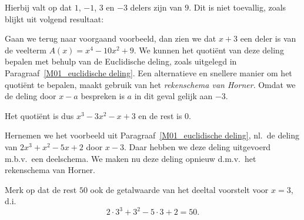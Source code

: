 \documentclass{ximera}
\begin{document}
Hierbij valt op dat $1$, $-1$, $3$ en $-3$ delers zijn van $9$.
Dit is niet toevallig, zoals blijkt uit volgend resultaat:

\noindent{}

Gaan we terug naar voorgaand voorbeeld, dan zien we dat $x+3$ een
deler is van de veelterm $A(x)=x^4-10x^2+9$. We kunnen het
quoti\"{e}nt van deze deling bepalen met behulp van de Euclidische
deling, zoals uitgelegd in Paragraaf~\ref{M01_euclidische deling}. Een
alternatieve en snellere manier om het quoti\"{e}nt te bepalen,
maakt gebruik van het \emph{rekenschema van Horner}. Omdat we de
deling door $x-a$ bespreken is $a$ in dit geval gelijk aan $-3$.

\begin{center}%
\end{center}

\noindent Het quoti\"{e}nt is dus $x^3-3x^2-x+3$ en de rest is
$0$.

Hernemen we het voorbeeld uit Paragraaf~\ref{M01_euclidische deling},
nl.~de deling van $2x^3+x^2-5x+2$ door $x-3$. Daar hebben we deze
deling uitgevoerd m.b.v.~een deelschema. We maken nu deze deling
opnieuw d.m.v.~het rekenschema van Horner.

\begin{center}%
\end{center}

\noindent Merk op dat de rest $50$ ook de getalwaarde van het
deeltal voorstelt voor $x=3$, d.i.\[2\cdot3^3+3^2-5\cdot3+2=50.\]
\end{document}
